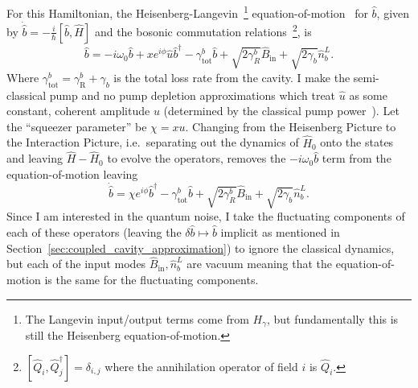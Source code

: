 For this Hamiltonian, the Heisenberg-Langevin~\footnote{The Langevin input/output terms come from $H_\gamma$, but fundamentally this is still the Heisenberg equation-of-motion.} equation-of-motion~\cite{GardinerCollete} for $\hat b$, given by $\dot{\hat b}=-\frac{i}{\hbar}[\hat b,\hat H]$ and the bosonic commutation relations~\footnote{$[\hat Q_i,\hat Q_j^\dag]=\delta_{i,j}$ where the annihilation operator of field $i$ is $\hat Q_i$.}, is 
\begin{equation}
\dot{\hat{b}}= -i\omega_0 \hat b+x e^{i\phi} \hat u\hat b^\dag - \gamma^b_\mathrm{tot} \hat{b} + \sqrt{2\gamma^b_R}\hat{B}_\mathrm{in} + \sqrt{2\gamma_b}\hat{n}^L_b.
\end{equation}
Where $\gamma^b_\text{tot}=\gamma^b_\text{R}+\gamma_b$ is the total loss rate from the cavity. I make the semi-classical pump and no pump depletion approximations which treat $\hat u$ as some constant, coherent amplitude $u$ (determined by the classical pump power~\cite{}). Let the ``squeezer parameter'' be $\chi = x u$. Changing from the Heisenberg Picture to the Interaction Picture, i.e.\ separating out the dynamics of $\hat H_0$ onto the states and leaving $\hat H - \hat H_0$ to evolve the operators, removes the $-i\omega_0 \hat b$ term from the equation-of-motion leaving %
\begin{equation}
\label{eq:dOPO_pre_FT}
\dot{\hat{b}}= \chi e^{i\phi}\hat b^\dag - \gamma^b_\mathrm{tot} \hat{b} + \sqrt{2\gamma^b_R}\hat{B}_\mathrm{in} + \sqrt{2\gamma_b}\hat{n}^L_b.
\end{equation}
Since I am interested in the quantum noise, I take the fluctuating components of each of these operators (leaving the $\delta \hat b\mapsto\hat b$ implicit as mentioned in Section~\ref{sec:coupled_cavity_approximation}) to ignore the classical dynamics, but each of the input modes $\hat{B}_\mathrm{in}, \hat{n}^L_b$ are vacuum meaning that the equation-of-motion is the same for the fluctuating components. 

